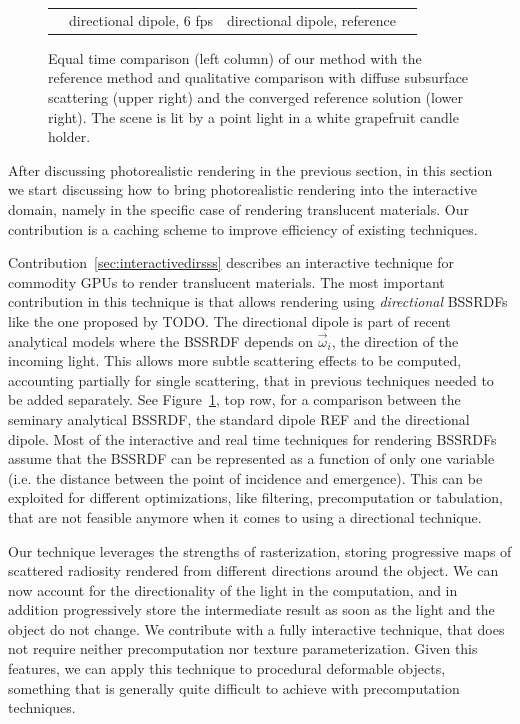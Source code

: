 \begin{figure}[t]
\begin{tabular}{@{}c@{$\,$}c@{}c@{}c@{}}
& directional dipole, 6 fps & directional dipole, reference \\[-1ex]
\end{tabular}
\caption{Equal time comparison (left column) of our method with the reference method and qualitative comparison with diffuse subsurface scattering (upper right) and the converged reference solution (lower right). The scene is lit by a point light in a white grapefruit candle holder.} %
\label{fig:optixcomparison}
\end{figure}

After discussing photorealistic rendering in the previous section, in this section we start discussing how to bring photorealistic rendering into the interactive domain, namely in the specific case of rendering translucent materials. Our contribution is a caching scheme to improve efficiency of existing techniques.

Contribution~\ref{sec:interactivedirsss} describes an interactive technique for commodity GPUs to render translucent materials. The most important contribution in this technique is that allows rendering using \emph{directional} BSSRDFs like the one proposed by TODO. The directional dipole is part of recent analytical models where the BSSRDF depends on $\vec{\omega}_i$, the direction of the incoming light. This allows more subtle scattering effects to be computed, accounting partially for single scattering, that in previous techniques needed to be added separately. See Figure~\ref{fig:optixcomparison}, top row, for a comparison between the seminary analytical BSSRDF, the standard dipole REF and the directional dipole. Most of the interactive and real time techniques for rendering BSSRDFs assume that the BSSRDF can be represented as a function of only one variable (i.e. the distance between the point of incidence and emergence). This can be exploited for different optimizations, like filtering, precomputation or tabulation, that are not feasible anymore when it comes to using a directional technique.

Our technique leverages the strengths of rasterization, storing progressive maps of scattered radiosity rendered from different directions around the object. We can now account for the directionality of the light in the computation, and in addition progressively store the intermediate result as soon as the light and the object do not change. We contribute with a fully interactive technique, that does not require neither precomputation nor texture parameterization. Given this features, we can apply this technique to procedural deformable objects, something that is generally quite difficult to achieve with precomputation techniques. 

